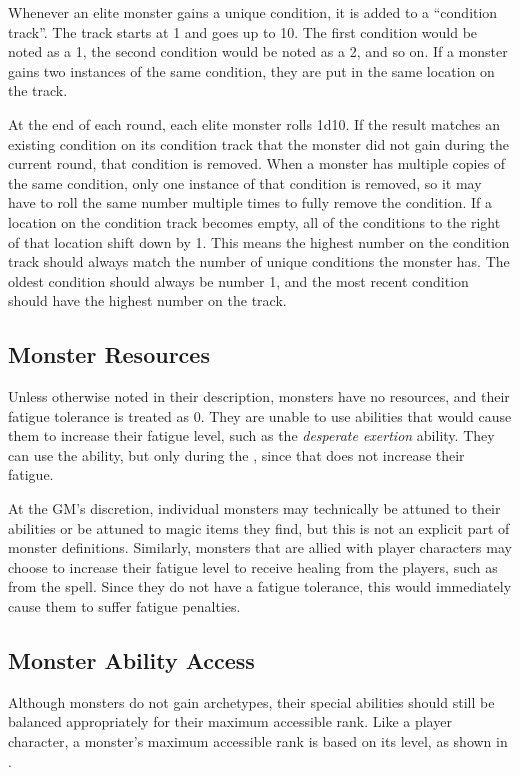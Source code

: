             Whenever an elite monster gains a unique condition, it is added to a ``condition track''.
            The track starts at 1 and goes up to 10.
            The first condition would be noted as a 1, the second condition would be noted as a 2, and so on.
            If a monster gains two instances of the same condition, they are put in the same location on the track.

            At the end of each round, each elite monster rolls 1d10.
            If the result matches an existing condition on its condition track that the monster did not gain during the current round, that condition is removed.
            When a monster has multiple copies of the same condition, only one instance of that condition is removed, so it may have to roll the same number multiple times to fully remove the condition.
            If a location on the condition track becomes empty, all of the conditions to the right of that location shift down by 1.
            This means the highest number on the condition track should always match the number of unique conditions the monster has.
            The oldest condition should always be number 1, and the most recent condition should have the highest number on the track.

        \subsection{Monster Resources}
            Unless otherwise noted in their description, monsters have no resources, and their fatigue tolerance is treated as 0.
            They are unable to use abilities that would cause them to increase their fatigue level, such as the \textit{desperate exertion} ability.
            They can use the  ability, but only during the , since that does not increase their fatigue.

            At the GM's discretion, individual monsters may technically be attuned to their abilities or be attuned to magic items they find, but this is not an explicit part of monster definitions.
            Similarly, monsters that are allied with player characters may choose to increase their fatigue level to receive healing from the players, such as from the  spell.
            Since they do not have a fatigue tolerance, this would immediately cause them to suffer fatigue penalties.

        \subsection{Monster Ability Access}\label{Monster Ability Access}
            Although monsters do not gain archetypes, their special abilities should still be balanced appropriately for their maximum accessible rank.
            Like a player character, a monster's maximum accessible rank is based on its level, as shown in .

